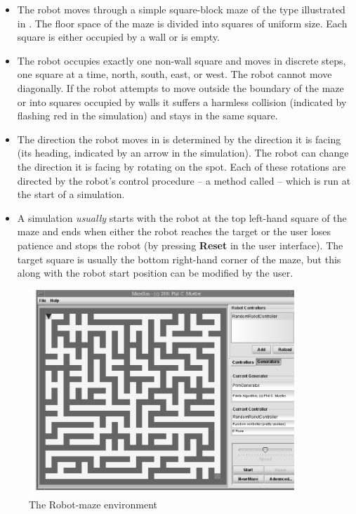 \begin{itemize}

\item The robot moves through a simple square-block maze of the type
  illustrated in .  The floor space of the maze is divided into squares of uniform size. Each square is either occupied by a wall or is empty.

\item The robot occupies exactly one non-wall square and moves in
  discrete steps, one square at a time, north, south, east, or west.
  The robot cannot move diagonally.  If the robot attempts to move
  outside the boundary of the maze or into squares occupied by walls it
  suffers a harmless collision (indicated by flashing red in the
  simulation) and stays in the same square.

\item The direction the robot moves in is determined by the direction it is facing (its heading, indicated by an arrow in the simulation).  The robot can change the direction it is facing by rotating on the spot. Each of these rotations are directed by the robot's control procedure -- a method called  -- which is run at the start of a simulation. 

\item A simulation \emph{usually} starts with the robot at the top left-hand square of the maze and ends when either the robot reaches the target or the user loses patience and stops the robot (by pressing {\bf Reset} in the user interface). The target square is usually the bottom right-hand corner of the maze, but this along with the robot start position can be modified by the user. 

\end{itemize}

\begin{figure}
\centering
\includegraphics[width=10cm]{maze.pdf}
\caption{The Robot-maze environment\label{maze}}
\end{figure}

